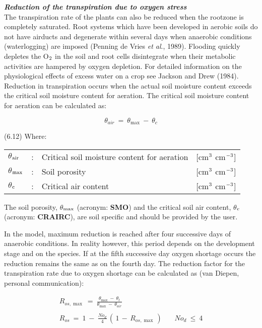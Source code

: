{\bf {\it Reduction of the transpiration due to oxygen stress\/}}\\
The transpiration rate of the plants can also be reduced when the rootzone is completely
saturated. Root systems which have been developed in aerobic soils do not have airducts
and degenerate within several days when anaerobic conditions (waterlogging) are imposed
(Penning de Vries {\it et al\/}., 1989). Flooding quickly depletes the O$_{{\rm 2}}$ in the soil and root cells
disintegrate when their metabolic activities are hampered by oxygen depletion. For
detailed information on the physiological effects of excess water on a crop see Jackson
and Drew (1984).\\
Reduction in transpiration occurs when the actual soil moisture content exceeds the
critical soil moisture content for aeration. The critical soil moisture content for aeration
can be calculated as:

\begin{equation}
\theta  _{air} ~=~ \theta _{\max } ~-~\theta  _{c} 
\end{equation}

 
\strut\hfill (6.12)
Where:\\
\begin{tabularx}{\textwidth}{llXr}



 $\theta$$_{{\rm air}}$ &:& Critical soil moisture content for aeration & [cm$^{{\rm 3}}$ cm$^{{\rm -3}}$]\\
 $\theta$$_{{\rm max}}$ &:& Soil porosity & [cm$^{{\rm 3}}$ cm$^{{\rm -3}}$]\\
 $\theta$$_{{\rm c}}$ &:& Critical air content & [cm$^{{\rm 3}}$ cm$^{{\rm -3}}$]
\end{tabularx}


The soil porosity, {\bf $\theta$$_{{\rm max}}$} (acronym: {\bf SMO}) and the critical soil air content, {\bf $\theta$$_{{\rm c}}$} (acronym:
{\bf CRAIRC}), are soil specific and should be provided by the user. 


In the model, maximum reduction is reached after four successive days of anaerobic
conditions. In reality however, this period depends on the development stage and on the
species. If at the fifth successive day oxygen shortage occurs the reduction remains the
same as on the fourth day. The reduction factor for the transpiration rate due to oxygen
shortage {\nobreak}can be calculated as (van Diepen, personal communication):

\begin{eqnarray*}
R _{os,\max } ~=~{\frac{ \theta  _{\max } ~-~ \theta  _{t} }{\theta _{\max } ~-~ \theta  _{air} }} \nonumber  \\
~ \nonumber  \\
R _{os} ~=~ 1~-~{\frac{No _{d} }{4}} \, (\, 1\, -\, R _{os,\max } \, )~~~~~~~~No _{d} ~\le ~ 4
\end{eqnarray*}

